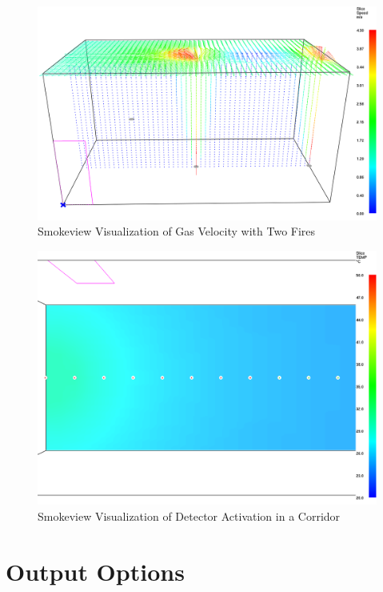 \begin{figure}[h!]
\begin{center}
\includegraphics[width=6.5in]{FIGURES/SMV_Velocity}
\caption{Smokeview Visualization of Gas Velocity with Two Fires}
\end{center}
\end{figure}

\begin{figure}[h!]
\begin{center}
\includegraphics[width=6.5in]{FIGURES/SMV_Detectors}
\caption{Smokeview Visualization of Detector Activation in a Corridor}
\end{center}
\end{figure}

\section{Output Options}

